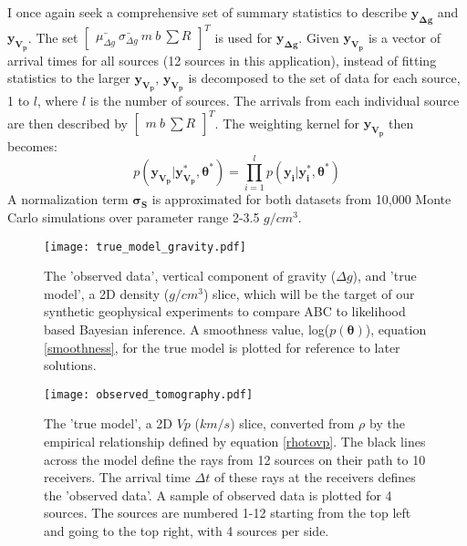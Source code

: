 I once again seek a comprehensive set of summary statistics to describe $\bm{y_{\Delta g}}$ and $\bm{y_{V_p}}$. The set $\begin{bmatrix}
\bar{\mu_{\Delta g}}\ \bar{\sigma_{\Delta g}}\ m\ b\ \sum R
\end{bmatrix}^T$ is used for $\bm{y_{\Delta g}}$. Given $\bm{y_{V_p}}$ is a vector of arrival times for all sources (12 sources in this application), instead of fitting statistics to the larger $\bm{y_{V_p}}$, $\bm{y_{V_p}}$ is decomposed to the set of data for each source, 1 to $l$, where $l$ is the number of sources. The arrivals from each individual source are then described by $\begin{bmatrix}
m\ b\ \sum R
\end{bmatrix}^T$. The weighting kernel for $\bm{y_{V_p}}$ then becomes:
\begin{equation}
	p(\bm{y_{V_p}}|\bm{y^*_{V_p}},\bm{\theta^*}) = \prod_{i = 1}^{l} p(\bm{y_i}|\bm{y^*_i},\bm{\theta^*})
\end{equation}
A normalization term $\bm{\sigma_S}$ is approximated for both datasets from 10,000 Monte Carlo simulations over parameter range 2-3.5 $g/cm^3$. \par

\begin{figure}[H]
	\centering
	\texttt{[image: true\_model\_gravity.pdf]}
	\caption{The 'observed data', vertical component of gravity ($\Delta g$), and 'true model', a 2D density ($g/cm^3$) slice, which will be the target of our synthetic geophysical experiments to compare ABC to likelihood based Bayesian inference. A smoothness value, log($p(\bm{\theta})$), equation \ref{smoothness}, for the true model is plotted for reference to later solutions.}
	\label{true-model-large-grav}
\end{figure}

\begin{figure}[H]
	\centering
	\texttt{[image: observed\_tomography.pdf]}
	\caption{The 'true model', a 2D $Vp$ ($km/s$) slice, converted from $\rho$ by the empirical relationship defined by equation \ref{rhotovp}. The black lines across the model define the rays from 12 sources on their path to 10 receivers. The arrival time $\Delta t$ of these rays at the receivers defines the 'observed data'. A sample of observed data is plotted for 4 sources. The sources are numbered 1-12 starting from the top left and going to the top right, with 4 sources per side.}
	\label{true-model-tom}
\end{figure}

